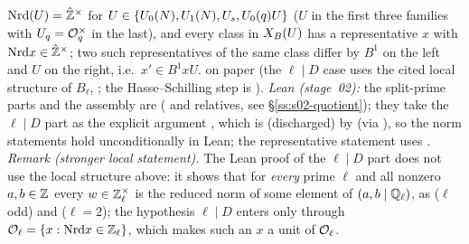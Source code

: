 \begin{lemma}\label{lem:s01-nrd}
$\mathrm{Nrd}(U)=\hat{\mathbb{Z}}^\times$ for $U\in\{U_0(N),U_1(N),U_s,U_0(q)U\}$ ($U$ in the first three families with $U_q=\mathcal{O}_q^\times$ in the
last), and every class in $X_B(U)$ has a representative $x$ with
$\mathrm{Nrd} x\in\hat{\mathbb{Z}}^\times$; two such representatives of the same class differ by $B^1$ on the left and $U$ on the right, i.e.\ $x'\in B^1xU$. \stproved{} on paper (the $\ell\mid D$ case uses the cited local structure of $B_\ell$,
; the Hasse--Schilling step is \stcited{}).
\emph{Lean (stage~02):} the split-prime parts and the assembly are \stformal{} ( and relatives, see
\S\ref{ss:s02-quotient}); they take the $\ell\mid D$ part as the explicit argument , which is
\stformal{} (discharged) by  (via ), so the norm statements
hold unconditionally in Lean; the representative statement uses .
\emph{Remark (stronger local statement).} The Lean proof of the $\ell\mid D$ part does not use the local structure above: it shows that for
\emph{every} prime $\ell$ and all nonzero $a,b\in\mathbb{Z}$ every $w\in\mathbb{Z}_\ell^\times$ is the reduced norm of some element of $(a,b\mid\mathbb{Q}_\ell)$,
\stformal{} as  ($\ell$ odd) and 
($\ell=2$); the hypothesis $\ell\mid D$ enters only through $\mathcal{O}_\ell=\{x:\mathrm{Nrd} x\in\mathbb{Z}_\ell\}$, which makes such an $x$ a unit of $\mathcal{O}_\ell$.
\end{lemma}
